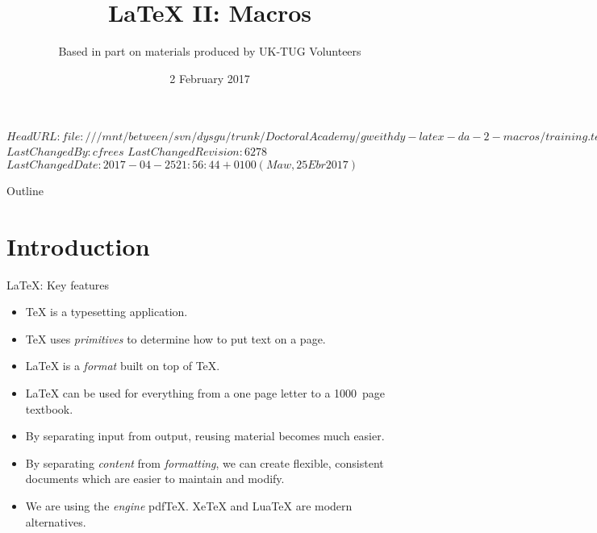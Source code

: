 \svnidlong
{$HeadURL: file:///mnt/between/svn/dysgu/trunk/DoctoralAcademy/gweithdy-latex-da-2-macros/training.tex $}
{$LastChangedBy: cfrees $}
{$LastChangedRevision: 6278 $}
{$LastChangedDate: 2017-04-25 21:56:44 +0100 (Maw, 25 Ebr 2017) $}



\title{\LaTeX{} II: Macros}
\subtitle{Based in part on materials produced by UK-TUG Volunteers}
\date{ 2 February 2017}




\begin{frame}
  \titlepage
\end{frame}

\maketitle


\tableofcontents

%
{
  \begin{frame}{Outline}
	\tableofcontents
  \end{frame}
}

\section{Introduction}

\begin{frame}{\LaTeX{}: Key features}

  \begin{itemize}
	\item \TeX{} is a typesetting application.
	\item \TeX{} uses \emph{primitives} to determine how to put text on a page.
	\item \LaTeX{} is  a \emph{format} built on top of \TeX{}.
	\item \LaTeX{} can be used for everything from a one page letter to a 1000~page textbook.
	\item By separating input from output, reusing material becomes much easier.
	\item By separating \emph{content} from \emph{formatting}, we can create flexible, consistent documents which are easier to maintain and modify.
	\item We are using the \emph{engine} pdf\TeX{}.
	Xe\TeX{} and Lua\TeX{} are modern alternatives.
  \end{itemize}

\end{frame}

